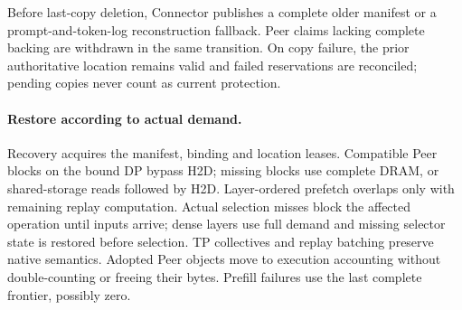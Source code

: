 Before last-copy deletion, Connector publishes a complete older manifest
or a prompt-and-token-log reconstruction fallback. Peer claims lacking
complete backing are withdrawn in the same transition. On copy failure,
the prior authoritative location remains valid and failed reservations
are reconciled; pending copies never count as current protection.

\paragraph{Restore according to actual demand.}
Recovery acquires the manifest, binding and location leases. Compatible
Peer blocks on the bound DP bypass H2D; missing blocks use complete DRAM,
or shared-storage reads followed by H2D. Layer-ordered prefetch overlaps
only with remaining replay computation. Actual selection misses block
the affected operation until inputs arrive; dense layers use full demand
and missing selector state is restored before selection. TP collectives
and replay batching preserve native semantics. Adopted Peer objects move
to execution accounting without double-counting or freeing their bytes.
Prefill failures use the last complete frontier, possibly zero.
